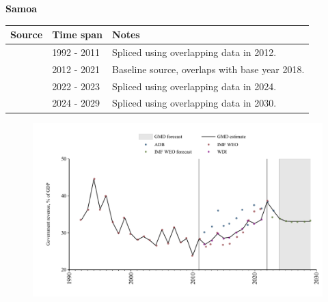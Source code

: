 \documentclass[12pt,a4paper,landscape]{article}
\begin{document}
\begin{adjustbox}{max totalsize={\paperwidth}{\paperheight},center}
\begin{minipage}[t][\textheight][t]{\textwidth}
\vspace*{0.5cm}
{}
\begin{center}
{\Large\bfseries Samoa}
\end{center}
\vspace{0.5cm}
\begin{table}[H]
\centering
\small
\begin{tabular}{|l|l|l|}
\hline
\textbf{Source} & \textbf{Time span} & \textbf{Notes} \\
\hline
\rowcolor{white}\cite{IMF_WEO}& 1992 - 2011 &Spliced using overlapping data in 2012.\\
\rowcolor{lightgray}\cite{WDI}& 2012 - 2021 &Baseline source, overlaps with base year 2018.\\
\rowcolor{white}\cite{ADB}& 2022 - 2023 &Spliced using overlapping data in 2024.\\
\rowcolor{lightgray}\cite{IMF_WEO_forecast}& 2024 - 2029 &Spliced using overlapping data in 2030.\\
\hline
\end{tabular}
\end{table}
\begin{figure}[H]
\centering
\includegraphics[width=\textwidth,height=0.6\textheight,keepaspectratio]{graphs/WSM_govrev_GDP.pdf}
\end{figure}
\end{minipage}
\end{adjustbox}
\end{document}
